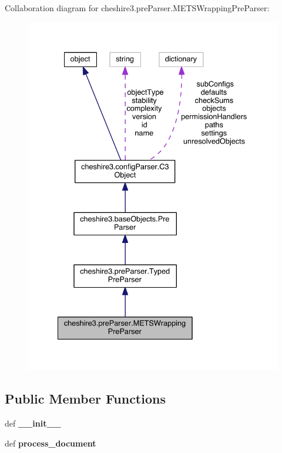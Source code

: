 Collaboration diagram for cheshire3.\-pre\-Parser.\-M\-E\-T\-S\-Wrapping\-Pre\-Parser\-:
\nopagebreak
\begin{figure}[H]
\begin{center}
\leavevmode
\includegraphics[width=334pt]{classcheshire3_1_1pre_parser_1_1_m_e_t_s_wrapping_pre_parser__coll__graph}
\end{center}
\end{figure}
\subsection*{Public Member Functions}
\begin{DoxyCompactItemize}
\item 
\hypertarget{classcheshire3_1_1pre_parser_1_1_m_e_t_s_wrapping_pre_parser_aa7ca3dfe52dab2a60b74bd428d22eccd}{def {\bfseries \-\_\-\-\_\-init\-\_\-\-\_\-}}\label{classcheshire3_1_1pre_parser_1_1_m_e_t_s_wrapping_pre_parser_aa7ca3dfe52dab2a60b74bd428d22eccd}

\item 
\hypertarget{classcheshire3_1_1pre_parser_1_1_m_e_t_s_wrapping_pre_parser_a64ccb959c463e821971093667733fee2}{def {\bfseries process\-\_\-document}}\label{classcheshire3_1_1pre_parser_1_1_m_e_t_s_wrapping_pre_parser_a64ccb959c463e821971093667733fee2}

\end{DoxyCompactItemize}
